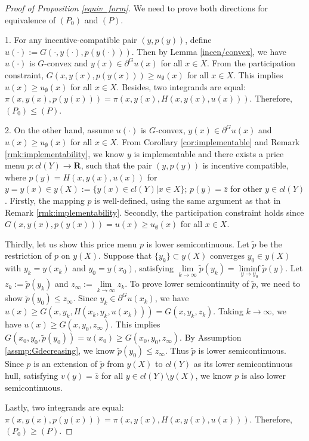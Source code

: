 \documentclass[a4paper, 11pt]{amsart}
\numberwithin{equation}{section}
\theoremstyle{plain}
\theoremstyle{definition}
\theoremstyle{remark}
\newcommand{\R}{\mathbf{R}}
\begin{document}
\begin{proof} [Proof of Proposition \ref{equiv_form}] We need to prove both directions for equivalence of $(P_0)$ and $(P)$.\medskip
	
	1. For any incentive-compatible pair $(y, p(y))$, define $u(\cdot) := G(\cdot,y(\cdot), p(y(\cdot)))$. Then by Lemma \ref{incen/convex}, we have $u(\cdot)$ is $G$-convex and $y(x) \in \partial^G u(x)$ for all $x \in X$. From the participation constraint, $G(x, y(x), p(y(x))) \ge u_{\emptyset}(x)$ for all $x\in X$. This implies $u(x)\ge u_{\emptyset}(x)$ for all $x\in X$. Besides, two integrands are equal: $\pi(x, y(x), p(y(x))) = \pi(x,y(x), H(x,y(x), u(x)))$. Therefore, $(P_0) \le (P)$.\medskip
	
	2. On the other hand, assume $u(\cdot)$ is $G$-convex, $y(x)\in \partial^G u(x)$ and $u(x) \ge u_{\emptyset}(x)$ for all $x \in X$. From Corollary \ref{cor:implementable} and Remark \ref{rmk:implementability}, we know $y$ is implementable and there exists a price menu $p: cl(Y) \longrightarrow \R$, such that the pair $(y, p(y))$ is incentive compatible, where $p(y) = H(x,y(x), u(x))$ for $y = y(x) \in y(X) :=\{ y(x) \in cl(Y) | x \in X \}$; $p(y) = \bar{z}$ for other $y\in cl(Y)$. Firstly, the mapping $p$ is well-defined, using the same argument as that in Remark \ref{rmk:implementability}. %
	Secondly, the participation constraint holds since $G(x,y(x), p(y(x))) = u(x) \ge u_{\emptyset}(x)$ for all $x\in X$. \medskip
	
	Thirdly, let us show this price menu $p$ is lower semicontinuous. Let $\tilde{p}$ be the restriction of $p$ on $y(X)$. Suppose that $\{y_k \} \subset y(X)$ converges $y_0 \in y(X)$ with $y_k = y(x_k)$ and $y_0 = y(x_0)$, satisfying $\lim\limits_{k \longrightarrow \infty} \tilde{p}(y_k) = \liminf\limits_{y \longrightarrow y_{0}} \tilde{p}(y)$.  Let $z_{k}:= \tilde{p}(y_k)$ and $z_{\infty}:=\lim\limits_{k \longrightarrow \infty} z_k$. To prove lower semicontinuity of $\tilde{p}$, we need to show $\tilde{p}(y_0)\le z_{\infty}$.  Since $y_k \in \partial^G u(x_k)$, we have $u(x) \ge G(x,y_k, H(x_k, y_k, u(x_k))) = G(x, y_k, z_k)$. Taking $k\longrightarrow \infty$, we have $u(x)\ge G(x, y_0, z_{\infty})$. This implies $G(x_0, y_0, \tilde{p}(y_0)) = u(x_0) \ge G(x_0, y_0, z_{\infty})$. By Assumption \ref{assmp:Gdecreasing}, we know $\tilde{p}(y_0) \le z_{\infty}$. Thus $\tilde{p}$ is lower semicontinuous. Since $p$ is an extension of $\tilde{p}$ from $y(X)$ to $cl(Y)$ as its lower semicontinuous hull, satisfying $v(y)= \bar{z}$ for all $y\in cl(Y)\setminus y(X)$, we know $p$ is also lower semicontinuous.
	\medskip
	
	Lastly, two integrands are equal: $\pi(x, y(x), p(y(x))) = \pi(x,y(x), H(x,y(x), u(x)))$. Therefore, $(P_0) \ge (P)$.
\end{proof}
\end{document}
